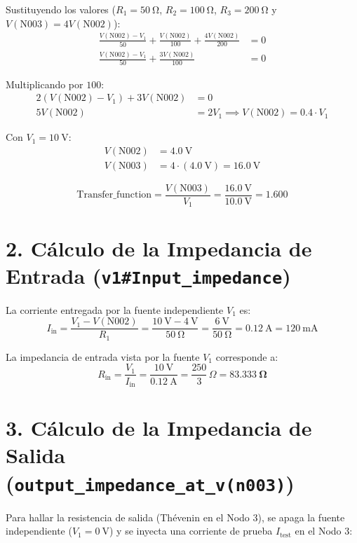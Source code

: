 \documentclass[11pt, a4paper]{article}
\begin{document}
Sustituyendo los valores ($R_1 = \qty{50}{\ohm}$, $R_2 = \qty{100}{\ohm}$, $R_3 = \qty{200}{\ohm}$ y $V(\text{N003}) = 4 V(\text{N002})$):
\begin{align*}
    \frac{V(\text{N002}) - V_1}{50} + \frac{V(\text{N002})}{100} + \frac{4 V(\text{N002})}{200} &= 0 \\
    \frac{V(\text{N002}) - V_1}{50} + \frac{3 V(\text{N002})}{100} &= 0
\end{align*}

Multiplicando por $100$:
\begin{align*}
    2(V(\text{N002}) - V_1) + 3 V(\text{N002}) &= 0 \\
    5 V(\text{N002}) &= 2 V_1 \implies V(\text{N002}) = 0.4 \cdot V_1
\end{align*}

Con $V_1 = \qty{10}{\volt}$:
\begin{align*}
    V(\text{N002}) &= \qty{4.0}{\volt} \\
    V(\text{N003}) &= 4 \cdot (\qty{4.0}{\volt}) = \qty{16.0}{\volt}
\end{align*}

\begin{equation*}
    \text{Transfer\_function} = \frac{V(\text{N003})}{V_1} = \frac{\qty{16.0}{\volt}}{\qty{10.0}{\volt}} = \mathbf{1.600}
\end{equation*}

\section*{2. Cálculo de la Impedancia de Entrada (\texttt{v1\#Input\_impedance})}
La corriente entregada por la fuente independiente $V_1$ es:
\begin{equation*}
    I_{\text{in}} = \frac{V_1 - V(\text{N002})}{R_1} = \frac{\qty{10}{\volt} - \qty{4}{\volt}}{\qty{50}{\ohm}} = \frac{\qty{6}{\volt}}{\qty{50}{\ohm}} = \qty{0.12}{\ampere} = \qty{120}{\milli\ampere}
\end{equation*}

La impedancia de entrada vista por la fuente $V_1$ corresponde a:
\begin{equation*}
    R_{\text{in}} = \frac{V_1}{I_{\text{in}}} = \frac{\qty{10}{\volt}}{\qty{0.12}{\ampere}} = \frac{250}{3}\,\Omega = \mathbf{\qty{83.333}{\ohm}}
\end{equation*}

\section*{3. Cálculo de la Impedancia de Salida (\texttt{output\_impedance\_at\_v(n003)})}
Para hallar la resistencia de salida (Thévenin en el Nodo 3), se apaga la fuente independiente ($V_1 = \qty{0}{\volt}$) y se inyecta una corriente de prueba $I_{\text{test}}$ en el Nodo 3:
\end{document}

